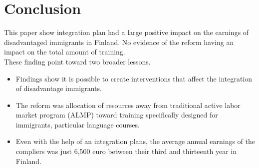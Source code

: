 \documentclass[../root]{subfiles}
\begin{document}
    \section{Conclusion}
    This paper show integration plan had a large positive impact on the earnings of disadvantaged immigrants in Finland. No evidence of the reform having an impact on the total amount of training. \\
    These finding point toward two broader lessons.
    \begin{itemize}
        \item Findings show it is possible to create interventions that affect the integration of disadvantage immigrants.
        \item The reform was allocation of resources away from traditional active labor market program (ALMP) toward training specifically designed for immigrants, particular language courses.
        \item Even with the help of an integration plans, the average annual earnings of the compliers was just 6,500 euro between their third and thirteenth year in Finland. 
    \end{itemize}
    
    \biblio
\end{document}
